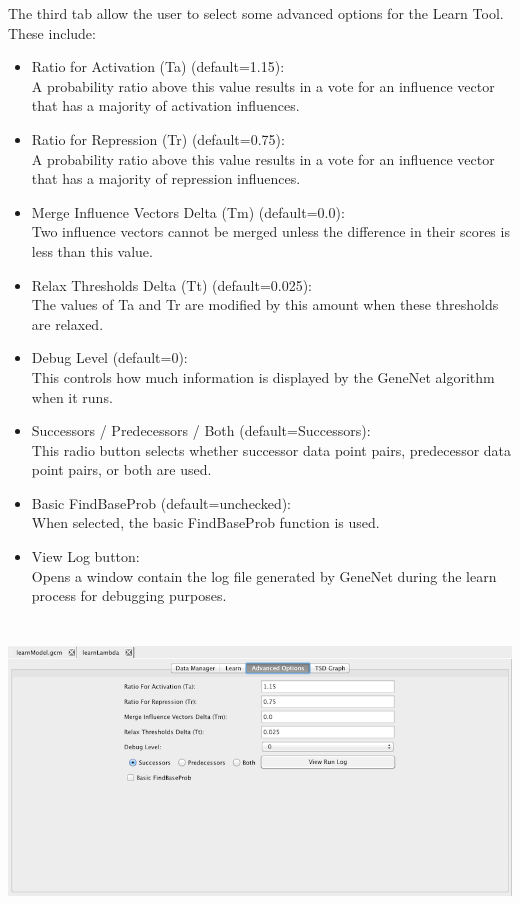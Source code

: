\documentclass[titlepage,11pt]{article}
\begin{document}
The third tab allow the user to select some advanced options for the Learn Tool.  These include:
\begin{itemize}
\item Ratio for Activation (Ta) (default=1.15): \\
A probability ratio above this value results in a vote for an influence vector that has a majority of activation influences.
\item Ratio for Repression (Tr) (default=0.75): \\
A probability ratio above this value results in a vote for an influence vector that has a majority of repression influences.
\item Merge Influence Vectors Delta (Tm) (default=0.0): \\
Two influence vectors cannot be merged unless the difference in their scores is less than this value.
\item Relax Thresholds Delta (Tt) (default=0.025): \\
The values of Ta and Tr are modified by this amount when these thresholds are relaxed.
\item Debug Level (default=0): \\
This controls how much information is displayed by the GeneNet algorithm when it runs.
\item Successors / Predecessors / Both (default=Successors): \\
This radio button selects whether successor data point pairs, predecessor data point pairs, or both are used.
\item Basic FindBaseProb (default=unchecked): \\
When selected, the basic FindBaseProb function is used.
\item View Log button:\\
Opens a window contain the log file generated by GeneNet during the learn process for debugging purposes.  
\end{itemize}

\begin{center}
\includegraphics[height=80mm]{screenshots/advLearn}
\end{center}
\end{document}
